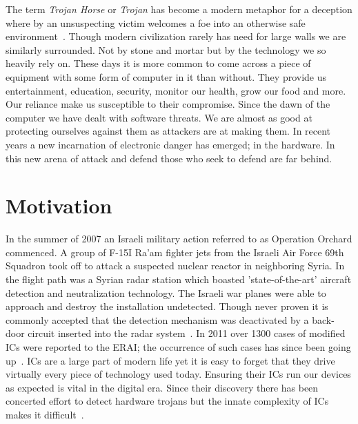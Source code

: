 \label{chapter:introduction}
The term \textit{Trojan Horse} or \textit{Trojan} has become a modern metaphor for a deception where by an unsuspecting victim welcomes a foe into an otherwise safe environment~\cite{searchForTrojanWar}.
Though modern civilization rarely has need for large walls we are similarly surrounded.
Not by stone and mortar but by the technology we so heavily rely on.
These days it is more common to come across a piece of equipment with some form of computer in it than without.
They provide us entertainment, education, security, monitor our health, grow our food and more.
Our reliance make us susceptible to their compromise.
Since the dawn of the computer we have dealt with software threats.
We are almost as good at protecting ourselves against them as attackers are at making them.
In recent years a new incarnation of electronic danger has emerged; in the hardware.
In this new arena of attack and defend those who seek to defend are far behind.

\section{Motivation}
In the summer of 2007 an Israeli military action referred to as Operation Orchard commenced.
A group of F-15I Ra'am fighter jets from the Israeli Air Force 69th Squadron took off to attack a suspected nuclear reactor in neighboring Syria.
In the flight path was a Syrian radar station which boasted 'state-of-the-art' aircraft detection and neutralization technology. 
The Israeli war planes were able to approach and destroy the installation undetected.
Though never proven it is commonly accepted that the detection mechanism was deactivated by a back-door circuit inserted into the radar system~\cite{stoppingHTsIEEESpectrum}.
In 2011 over 1300 cases of modified \acrshort{IC}s were reported to the \acrfull{ERAI}; the occurrence of such cases has since been going up~\cite{counterfeitIEEESpectrum}.
\acrfull{ICs} are a large part of modern life yet it is easy to forget that they drive virtually every piece of technology used today.
Ensuring their \acrshort{IC}s run our devices as expected is vital in the digital era.
Since their discovery there has been concerted effort to detect hardware trojans but the innate complexity of \acrshort{IC}s makes it difficult~\cite{hardwareTrojanSurvey2015}.

